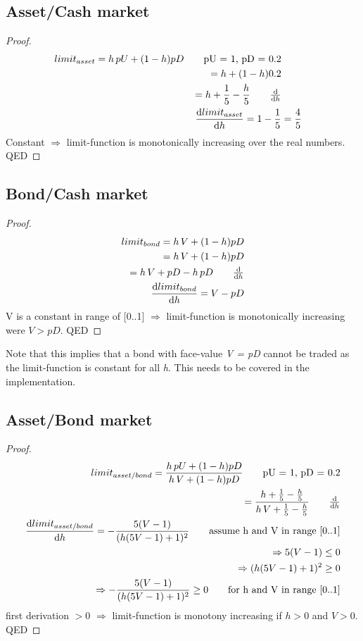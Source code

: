 \documentclass[Bachelorarbeit.tex]{subfiles}
\begin{document}
\subsection{Asset/Cash market}
\begin{proof}
\begin{align*}
	limit_{asset} = h \, pU + (1-h) pD		\tag*{pU = 1, pD = 0.2}
	\\ = h + (1 - h)0.2
	\\ = h + \frac{1}{5} - \frac{h}{5}		\tag*{$\frac{\mathrm d}{\mathrm d h}$}
	\\ \frac{\mathrm d limit_{asset}}{\mathrm d h} = 1 - \frac{1}{5}
		&= \frac{4}{5}
\end{align*}
Constant $\Rightarrow$ limit-function is monotonically increasing over the real numbers. QED
\end{proof}

\subsection{Bond/Cash market}
\begin{proof}
\begin{align*}
	limit_{bond} = h \, V + (1-h) pD			
	\\ = h \, V + (1 - h)pD
	\\ = h \, V + pD - h\,pD		\tag*{$\frac{\mathrm d}{\mathrm d h}$}
	\\ \frac{\mathrm d limit_{bond}}{\mathrm d h} = V - pD
\end{align*}
V is a constant in range of [0..1] $\Rightarrow$ limit-function is monotonically increasing were $V > pD$. QED
\end{proof}

Note that this implies that a bond with face-value \textit{V = pD} cannot be traded as the limit-function is constant for all \textit{h}. This needs to be covered in the implementation.

\subsection{Asset/Bond market}
\begin{proof}
\begin{align*}
	limit_{asset/bond} = \frac{h \, pU + (1-h) pD}{h \, V + (1-h) pD} 				\tag*{pU = 1, pD = 0.2}
	\\ = \frac{h + \frac{1}{5} - \frac{h}{5}}{h \, V + \frac{1}{5} - \frac{h}{5}}	\tag*{$\frac{\mathrm d}{\mathrm d h}$}
	\\ \frac{\mathrm d limit_{asset/bond}}{\mathrm d h} = - \frac{5(V-1)}{(h(5V-1)+1)^2}									\tag*{assume h and V in range [0..1]}
	\\ \Rightarrow 5(V-1) \leq 0
	\\ \Rightarrow (h(5V-1)+1)^2 \geq 0
	\\ \Rightarrow - \frac{5(V-1)}{(h(5V-1)+1)^2} \geq 0 			\tag*{for h and V in range [0..1]}
\end{align*}
first derivation $> 0$ $\Rightarrow$ limit-function is monotony increasing if $h > 0$ and $V > 0$. QED
\end{proof}
\end{document}
